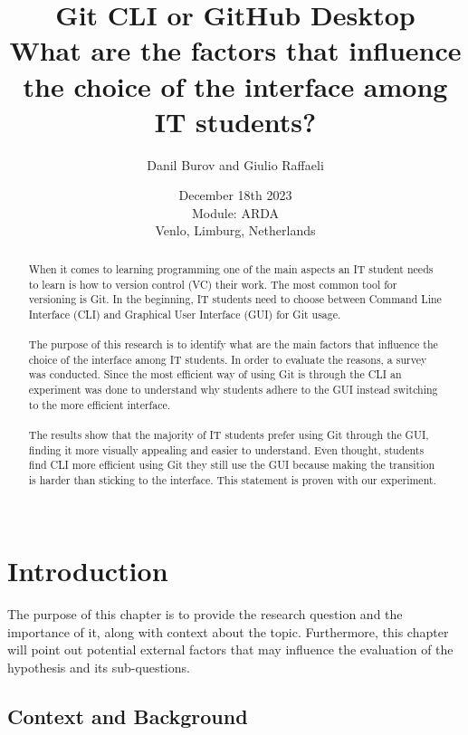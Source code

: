 \documentclass[]{report}
\title{Git CLI or GitHub Desktop \\ What are the factors that influence the choice of the interface among IT students?}
\author{Danil Burov and Giulio Raffaeli}
\date{December 18th 2023\\Module: ARDA \\Venlo, Limburg, Netherlands}
\begin{document}
	
	\maketitle
	

	\begin{abstract}
		
		When it comes to learning programming one of the main aspects an IT student needs to learn is how to version control (VC) their work. The most common tool for versioning is Git. In the beginning, IT students need to choose between Command Line Interface (CLI) and Graphical User Interface (GUI) for Git usage. \\\\
		
		
		The purpose of this research is to identify what are the main factors that influence the choice of the interface among IT students. In order to evaluate the reasons, a survey was conducted. Since the most efficient way of using Git is through the CLI an experiment was done to understand why students adhere to the GUI instead switching to the more efficient interface.\\\\
		
		The results show that the majority of IT students prefer using Git through the GUI, finding it more visually appealing and easier to understand. Even thought, students find CLI more efficient using Git they still use the GUI because making the transition is harder than sticking to the interface. This statement is proven with our experiment.\\\\
		
		
	\end{abstract}
	\tableofcontents
	\listoffigures 
	\pagebreak
	
	
	\section{Introduction}
	The purpose of this chapter is to provide the research question and the importance of it, along with context about the topic. Furthermore, this chapter will point out potential external factors that may influence the evaluation of the hypothesis and its sub-questions. \\
	\subsection{Context and Background}
	
\end{document}
